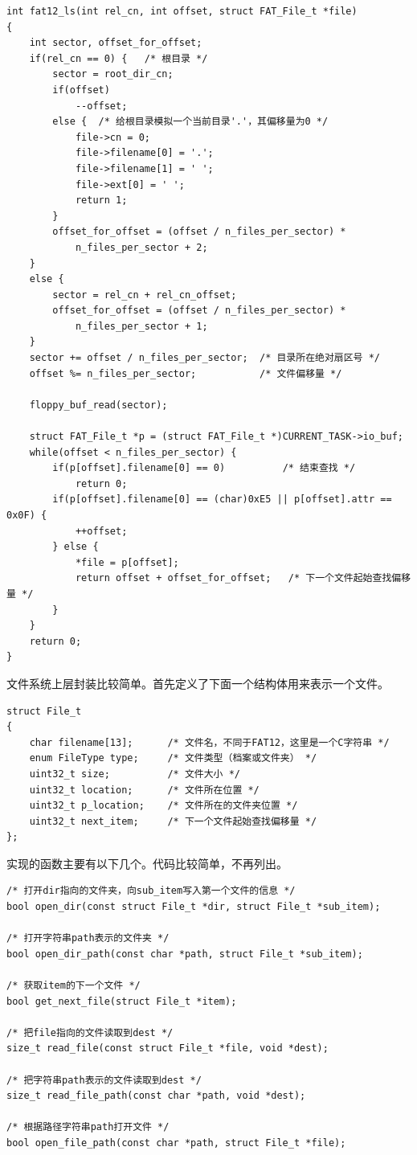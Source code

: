 \documentclass[a4paper, adobefonts]{ctexart}
\begin{document}
\begin{verbatim}
int fat12_ls(int rel_cn, int offset, struct FAT_File_t *file)
{
    int sector, offset_for_offset;
    if(rel_cn == 0) {   /* 根目录 */
        sector = root_dir_cn;
        if(offset)
            --offset;
        else {  /* 给根目录模拟一个当前目录'.'，其偏移量为0 */
            file->cn = 0;
            file->filename[0] = '.';
            file->filename[1] = ' ';
            file->ext[0] = ' ';
            return 1;
        }
        offset_for_offset = (offset / n_files_per_sector) *
            n_files_per_sector + 2;
    }
    else {
        sector = rel_cn + rel_cn_offset;
        offset_for_offset = (offset / n_files_per_sector) *
            n_files_per_sector + 1;
    }
    sector += offset / n_files_per_sector;  /* 目录所在绝对扇区号 */
    offset %= n_files_per_sector;           /* 文件偏移量 */

    floppy_buf_read(sector);

    struct FAT_File_t *p = (struct FAT_File_t *)CURRENT_TASK->io_buf;
    while(offset < n_files_per_sector) {
        if(p[offset].filename[0] == 0)          /* 结束查找 */
            return 0;
        if(p[offset].filename[0] == (char)0xE5 || p[offset].attr == 0x0F) {
            ++offset;
        } else {
            *file = p[offset];
            return offset + offset_for_offset;   /* 下一个文件起始查找偏移量 */
        }
    }
    return 0;
}
\end{verbatim}

文件系统上层封装比较简单。首先定义了下面一个结构体用来表示一个文件。

\begin{verbatim}
struct File_t
{
    char filename[13];      /* 文件名，不同于FAT12，这里是一个C字符串 */
    enum FileType type;     /* 文件类型（档案或文件夹） */
    uint32_t size;          /* 文件大小 */
    uint32_t location;      /* 文件所在位置 */
    uint32_t p_location;    /* 文件所在的文件夹位置 */
    uint32_t next_item;     /* 下一个文件起始查找偏移量 */
};
\end{verbatim}

实现的函数主要有以下几个。代码比较简单，不再列出。

\begin{verbatim}
/* 打开dir指向的文件夹，向sub_item写入第一个文件的信息 */
bool open_dir(const struct File_t *dir, struct File_t *sub_item);

/* 打开字符串path表示的文件夹 */
bool open_dir_path(const char *path, struct File_t *sub_item);

/* 获取item的下一个文件 */
bool get_next_file(struct File_t *item);

/* 把file指向的文件读取到dest */
size_t read_file(const struct File_t *file, void *dest);

/* 把字符串path表示的文件读取到dest */
size_t read_file_path(const char *path, void *dest);

/* 根据路径字符串path打开文件 */
bool open_file_path(const char *path, struct File_t *file);
\end{verbatim}
\end{document}
